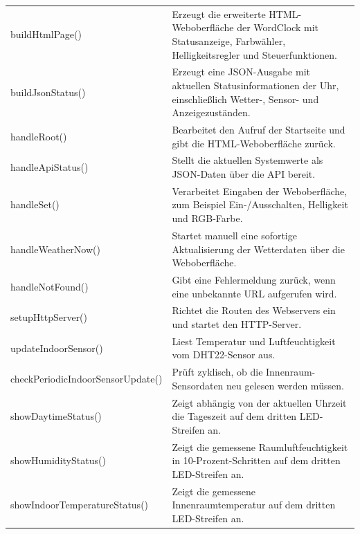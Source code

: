\begin{longtable}{p{} p{}}
{\small\ttfamily buildHtmlPage()} &
Erzeugt die erweiterte HTML-Weboberfläche der WordClock mit Statusanzeige, Farbwähler, Helligkeitsregler und Steuerfunktionen. \\

{\small\ttfamily buildJsonStatus()} &
Erzeugt eine JSON-Ausgabe mit aktuellen Statusinformationen der Uhr, einschließlich Wetter-, Sensor- und Anzeigezuständen. \\

{\small\ttfamily handleRoot()} &
Bearbeitet den Aufruf der Startseite und gibt die HTML-Weboberfläche zurück. \\

{\small\ttfamily handleApiStatus()} &
Stellt die aktuellen Systemwerte als JSON-Daten über die API bereit. \\

{\small\ttfamily handleSet()} &
Verarbeitet Eingaben der Weboberfläche, zum Beispiel Ein-/Ausschalten, Helligkeit und RGB-Farbe. \\

{\small\ttfamily handleWeatherNow()} &
Startet manuell eine sofortige Aktualisierung der Wetterdaten über die Weboberfläche. \\

{\small\ttfamily handleNotFound()} &
Gibt eine Fehlermeldung zurück, wenn eine unbekannte URL aufgerufen wird. \\

{\small\ttfamily setupHttpServer()} &
Richtet die Routen des Webservers ein und startet den HTTP-Server. \\

{\small\ttfamily updateIndoorSensor()} &
Liest Temperatur und Luftfeuchtigkeit vom DHT22-Sensor aus. \\

{\small\ttfamily checkPeriodicIndoorSensorUpdate()} &
Prüft zyklisch, ob die Innenraum-Sensordaten neu gelesen werden müssen. \\

{\small\ttfamily showDaytimeStatus()} &
Zeigt abhängig von der aktuellen Uhrzeit die Tageszeit auf dem dritten LED-Streifen an. \\

{\small\ttfamily showHumidityStatus()} &
Zeigt die gemessene Raumluftfeuchtigkeit in 10-Prozent-Schritten auf dem dritten LED-Streifen an. \\

{\small\ttfamily showIndoorTemperatureStatus()} &
Zeigt die gemessene Innenraumtemperatur auf dem dritten LED-Streifen an. \\


\end{longtable}
